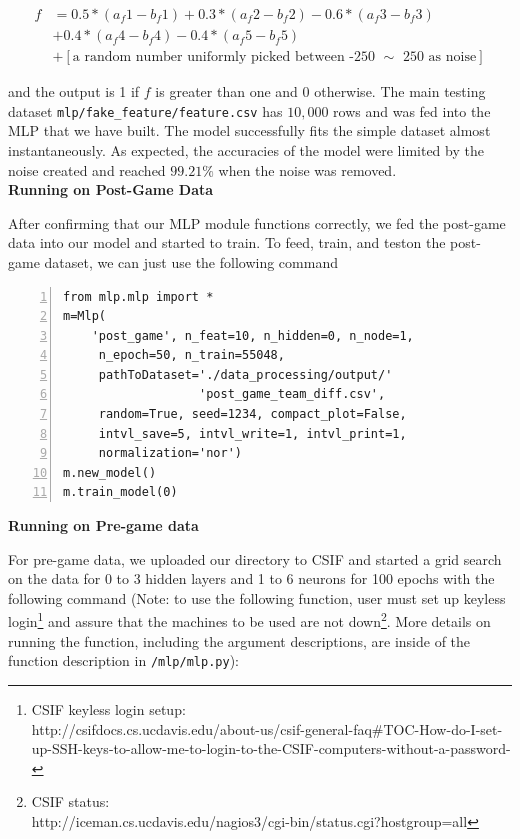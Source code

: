\documentclass[12pt]{article}
\begin{document}
\begin{align}
f &= 0.5*(a_f1-b_f1) + 0.3*(a_f2-b_f2) - 0.6*(a_f3-b_f3) \\
   &+ 0.4*(a_f4-b_f4) - 0.4*(a_f5-b_f5)\\
   &+ [\text{a random number uniformly picked between -250 $\sim$ 250 as noise}]
\end{align}

and the output is 1 if $f$ is greater than one and 0 otherwise. The main testing dataset \texttt{mlp/fake\_feature/feature.csv} has $10,000$ rows and was fed into the MLP that we have built. The model successfully fits the simple dataset almost instantaneously. As expected, the accuracies of the model were limited by the noise created and reached $99.21\%$ when the noise was removed. \\


\textbf{Running on Post-Game Data}

\quad After confirming that our MLP module functions correctly, we fed the post-game data into our model and started to train. To feed, train, and teston the post-game dataset, we can just use the following command

\lstset{language=Python, upquote=true}
\begin{lstlisting}[basicstyle=\small, numbers=left]
from mlp.mlp import *
m=Mlp(
    'post_game', n_feat=10, n_hidden=0, n_node=1, 
     n_epoch=50, n_train=55048,
     pathToDataset='./data_processing/output/'
                   'post_game_team_diff.csv',
     random=True, seed=1234, compact_plot=False,
     intvl_save=5, intvl_write=1, intvl_print=1,
     normalization='nor')
m.new_model()
m.train_model(0)
\end{lstlisting}

\textbf{Running on Pre-game data}

\quad For pre-game data, we uploaded our directory to CSIF and started a grid search on the data for 0 to 3 hidden layers and 1 to 6 neurons for 100 epochs with the following command (Note: to use the following function, user must set up keyless login\footnote{CSIF keyless login setup: \\ http://csifdocs.cs.ucdavis.edu/about-us/csif-general-faq\#TOC-How-do-I-set-up-SSH-keys-to-allow-me-to-login-to-the-CSIF-computers-without-a-password-} and assure that the machines to be used are not down\footnote{CSIF status: \\ http://iceman.cs.ucdavis.edu/nagios3/cgi-bin/status.cgi?hostgroup=all}. More details on running the function, including the argument descriptions, are inside of the function description in \texttt{/mlp/mlp.py}): 
\end{document}
